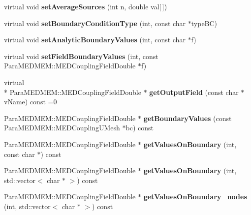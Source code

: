 \begin{DoxyCompactItemize}
\item 
\hypertarget{class___lib_mesh_problem_a16072901cecfeb9bbd0b0d08fbfe57f9}{virtual void {\bfseries set\-Average\-Sources} (int n, double val\mbox{[}$\,$\mbox{]})}\label{class___lib_mesh_problem_a16072901cecfeb9bbd0b0d08fbfe57f9}

\item 
\hypertarget{class___lib_mesh_problem_a946fb7a10e983e72514e3425dad4c3e3}{virtual void {\bfseries set\-Boundary\-Condition\-Type} (int, const char $\ast$type\-B\-C)}\label{class___lib_mesh_problem_a946fb7a10e983e72514e3425dad4c3e3}

\item 
\hypertarget{class___lib_mesh_problem_adbbdfff37ef4e7b782158e149a34734a}{virtual void {\bfseries set\-Analytic\-Boundary\-Values} (int, const char $\ast$f)}\label{class___lib_mesh_problem_adbbdfff37ef4e7b782158e149a34734a}

\item 
\hypertarget{class___lib_mesh_problem_a557e861b6fa94257b6709f75326b7b36}{virtual void {\bfseries set\-Field\-Boundary\-Values} (int, const Para\-M\-E\-D\-M\-E\-M\-::\-M\-E\-D\-Coupling\-Field\-Double $\ast$f)}\label{class___lib_mesh_problem_a557e861b6fa94257b6709f75326b7b36}

\item 
\hypertarget{class___lib_mesh_problem_a40cf9bfb39fd30c9ba333125d5b0f1d1}{virtual \\*
Para\-M\-E\-D\-M\-E\-M\-::\-M\-E\-D\-Coupling\-Field\-Double $\ast$ {\bfseries get\-Output\-Field} (const char $\ast$v\-Name) const =0}\label{class___lib_mesh_problem_a40cf9bfb39fd30c9ba333125d5b0f1d1}

\item 
\hypertarget{class___lib_mesh_problem_a3f1ba458781b0786b964d307a1c9052d}{Para\-M\-E\-D\-M\-E\-M\-::\-M\-E\-D\-Coupling\-Field\-Double $\ast$ {\bfseries get\-Boundary\-Values} (const Para\-M\-E\-D\-M\-E\-M\-::\-M\-E\-D\-Coupling\-U\-Mesh $\ast$bc) const }\label{class___lib_mesh_problem_a3f1ba458781b0786b964d307a1c9052d}

\item 
\hypertarget{class___lib_mesh_problem_adabbbfc50e278f967b2f807c3c53efde}{Para\-M\-E\-D\-M\-E\-M\-::\-M\-E\-D\-Coupling\-Field\-Double $\ast$ {\bfseries get\-Values\-On\-Boundary} (int, const char $\ast$) const }\label{class___lib_mesh_problem_adabbbfc50e278f967b2f807c3c53efde}

\item 
\hypertarget{class___lib_mesh_problem_ae4cf3497851c96cb997aed6dbd6434df}{Para\-M\-E\-D\-M\-E\-M\-::\-M\-E\-D\-Coupling\-Field\-Double $\ast$ {\bfseries get\-Values\-On\-Boundary} (int, std\-::vector$<$ char $\ast$ $>$) const }\label{class___lib_mesh_problem_ae4cf3497851c96cb997aed6dbd6434df}

\item 
\hypertarget{class___lib_mesh_problem_a230e0d7521a755a4a71227212a8279f0}{Para\-M\-E\-D\-M\-E\-M\-::\-M\-E\-D\-Coupling\-Field\-Double $\ast$ {\bfseries get\-Values\-On\-Boundary\-\_\-nodes} (int, std\-::vector$<$ char $\ast$ $>$) const }\label{class___lib_mesh_problem_a230e0d7521a755a4a71227212a8279f0}

\end{DoxyCompactItemize}

